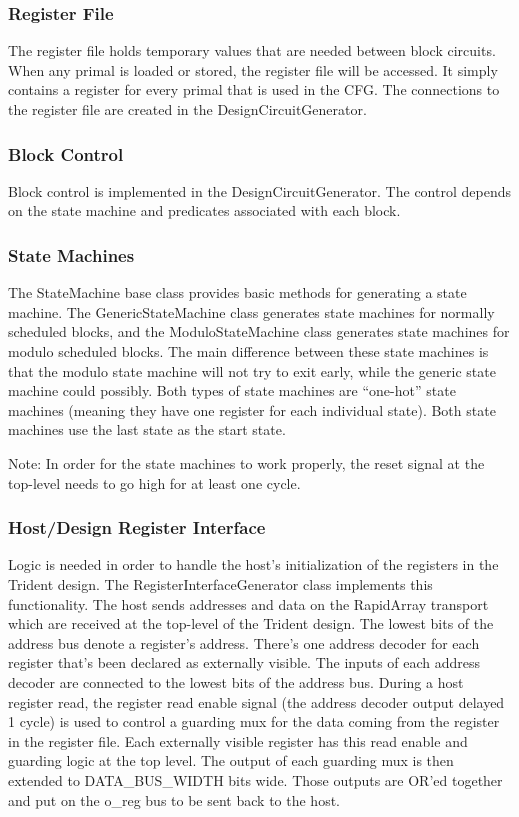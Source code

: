 \subsubsection{Register File}
The register file holds temporary values that are needed between block
circuits. When any primal is loaded or stored, the register file will
be accessed.  It simply contains a register for every primal that is
used in the CFG.  The connections to the register file are created in
the DesignCircuitGenerator.

\subsubsection{Block Control}
Block control is implemented in the DesignCircuitGenerator.  The
control depends on the state machine and predicates associated with
each block.

\subsubsection{State Machines}
The StateMachine base class provides basic methods for generating a
state machine.  The GenericStateMachine class generates state machines
for normally scheduled blocks, and the ModuloStateMachine class
generates state machines for modulo scheduled blocks.  The main
difference between these state machines is that the modulo state
machine will not try to exit early, while the generic state machine
could possibly.  Both types of state machines are ``one-hot'' state
machines (meaning they have one register for each individual state).
Both state machines use the last state as the start state.

Note: In order for the state machines to work properly, the reset
signal at the top-level needs to go high for at least one cycle.

\subsubsection{Host/Design Register Interface}
Logic is needed in order to handle the host's initialization of the
registers in the Trident design.  The RegisterInterfaceGenerator class
implements this functionality.  The host sends addresses and data on
the RapidArray transport which are received at the top-level of the
Trident design.  The lowest bits of the address bus denote a
register's address.  There's one address decoder for each register
that's been declared as externally visible.  The inputs of each
address decoder are connected to the lowest bits of the address bus.
During a host register read, the register read enable signal (the
address decoder output delayed 1 cycle) is used to control a guarding
mux for the data coming from the register in the register file.  Each
externally visible register has this read enable and guarding logic at
the top level.  The output of each guarding mux is then extended to
DATA\_BUS\_WIDTH bits wide.  Those outputs are OR'ed together and put
on the o\_reg bus to be sent back to the host.

